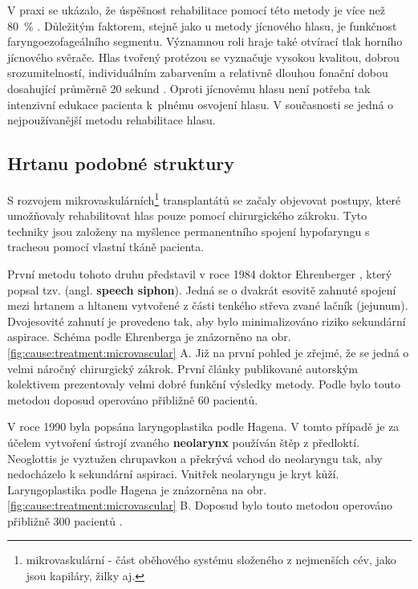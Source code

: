 V praxi se ukázalo, že úspěšnost rehabilitace pomocí této metody je více než 80~\%
\cite{Slavicek2002}. Důležitým faktorem, stejně jako u metody jícnového hlasu, je
funkčnost faryngoezofageálního segmentu. Významnou roli hraje také otvírací tlak horního
jícnového svěrače. Hlas tvořený protézou se vyznačuje vysokou kvalitou, dobrou
srozumitelností, individuálním zabarvením a relativně dlouhou fonační dobou
dosahující průměrně 20 sekund \cite{Saito2003}. Oproti jícnovému hlasu není potřeba
tak intenzivní edukace pacienta k~plnému osvojení hlasu. V současnosti se
jedná o nejpoužívanější metodu rehabilitace hlasu.


\subsection{Hrtanu podobné struktury} %
\label{chap:cause:tratment:structure}

S rozvojem mikrovaskulárních\footnote{mikrovaskulární - část oběhového systému
složeného z nejmenších cév, jako jsou kapiláry, žilky aj.} transplantátů se
začaly objevovat postupy, které umožňovaly rehabilitovat hlas pouze pomocí
chirurgického zákroku. Tyto techniky jsou založeny na myšlence permanentního spojení hypofaryngu
s tracheou pomocí vlastní tkáně pacienta.

První metodu tohoto druhu představil v roce 1984 doktor Ehrenberger
\cite{Kramp2009}, který popsal tzv. 
(angl. \textbf{speech siphon}). Jedná se o dvakrát esovitě zahnuté spojení mezi hrtanem a hltanem
vytvořené z části tenkého střeva zvané lačník (jejunum). Dvojesovité zahnutí je provedeno tak, aby
bylo minimalizováno riziko sekundární aspirace. Schéma 
podle Ehrenberga je znázorněno na obr. \ref{fig:cause:treatment:microvascular}
A. Již na první pohled je zřejmé, že se jedná o velmi náročný chirurgický
zákrok. První články publikované autorským kolektivem prezentovaly velmi dobré
funkční výsledky metody. Podle \cite {Sebova-Sedenkova2006} bylo touto metodou doposud
operováno přibližně 60 pacientů.

V roce 1990 byla popsána laryngoplastika podle Hagena. V tomto případě je za účelem vytvoření ústrojí zvaného \textbf{neolarynx} používán štěp z předloktí. Neoglottis je vyztužen chrupavkou
a překrývá vchod do neolaryngu tak, aby nedocházelo k sekundární aspiraci. Vnitřek neolaryngu je kryt kůží.
Laryngoplastika podle Hagena je znázorněna na obr.
\ref{fig:cause:treatment:microvascular} B. Doposud bylo touto metodou operováno přibližně 300
pacientů \cite{Sebova-Sedenkova2006}.

